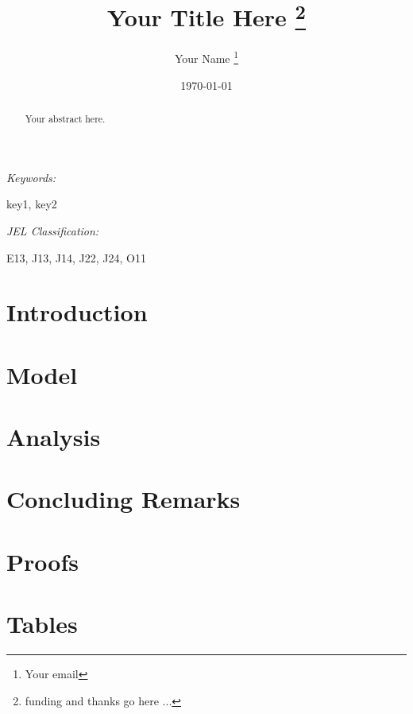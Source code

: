 \documentclass[11pt,a4paper]{article}
\title{
    Your Title Here
    \footnote{ funding and thanks go here ...}
}
\author{Your Name \thanks{Your email}}
\date{\vspace*{0.5cm} \today}
\theoremstyle{definition}\newtheorem{remark}{Remark}
\theoremstyle{definition}\newtheorem{definition}{Definition}
\theoremstyle{definition}\newtheorem{fact}{Fact}
\numberwithin{equation}{section}
\newenvironment{keywords}{%
    \vspace{10pt}
    \noindent\textit{Keywords:}\quad
}{%
    \par\vspace{10pt}
}
\newenvironment{jelclass}{%
    \vspace{10pt}
    \noindent\textit{JEL Classification:}\quad
}{%
    \par\vspace{10pt}
}
\begin{document}
\bgroup
\begin{singlespace}
\maketitle

\begin{abstract}
    \noindent
    Your abstract here.
\end{abstract}

\begin{keywords}
    key1, key2
\end{keywords}

\begin{jelclass}
    E13, J13, J14, J22, J24, O11
\end{jelclass}

\end{singlespace}
\thispagestyle{empty}

\clearpage
\egroup
\setcounter{page}{1}

\section{Introduction}
\section{Model}
\section{Analysis}
\section{Concluding Remarks}

\clearpage



\clearpage
\appendix
\section{Proofs}
\section{Tables}
\end{document}
